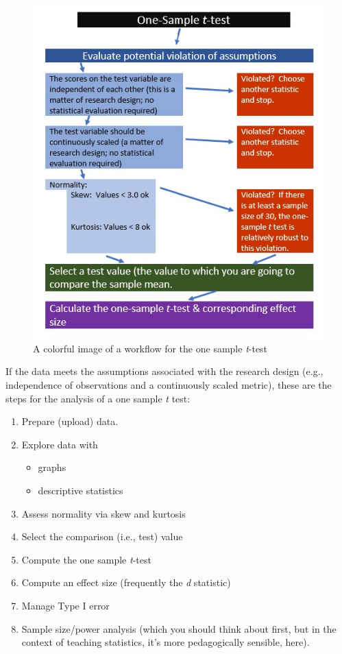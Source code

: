 \documentclass[
  11pt,
]{book}
\providecommand{\tightlist}{%
  \setlength{\itemsep}{0pt}\setlength{\parskip}{0pt}}
\begin{document}
\begin{figure}
\centering
\includegraphics{images/ttests/OneSampleWrkFlw.jpg}
\caption{A colorful image of a workflow for the one sample \emph{t}-test}
\end{figure}

If the data meets the assumptions associated with the research design (e.g., independence of observations and a continuously scaled metric), these are the steps for the analysis of a one sample \emph{t} test:

\begin{enumerate}
\def\labelenumi{\arabic{enumi}.}
\tightlist
\item
  Prepare (upload) data.
\item
  Explore data with

  \begin{itemize}
  \tightlist
  \item
    graphs
  \item
    descriptive statistics
  \end{itemize}
\item
  Assess normality via skew and kurtosis
\item
  Select the comparison (i.e., test) value
\item
  Compute the one sample \emph{t}-test
\item
  Compute an effect size (frequently the \emph{d} statistic)
\item
  Manage Type I error
\item
  Sample size/power analysis (which you should think about first, but in the context of teaching statistics, it's more pedagogically sensible, here).
\end{enumerate}
\end{document}
